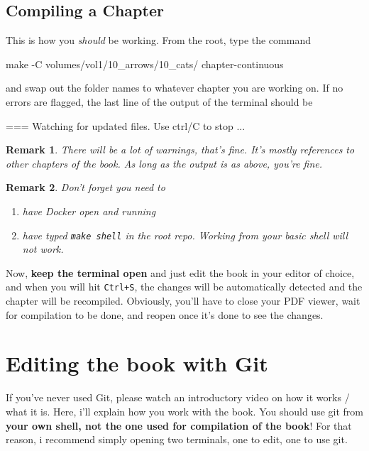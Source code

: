 \documentclass{article}
\newtheorem{remark}{Remark}
\begin{document}
\subsection{Compiling a Chapter}
This is how you \textit{should} be working. From the root, type the command
\begin{bashcode}
    make -C volumes/vol1/10_arrows/10_cats/ chapter-continuous
\end{bashcode}
and swap out the folder names to whatever chapter you are working on. If no errors are flagged, the last line of the output of the terminal should be 
\begin{bashcode}
    === Watching for updated files. Use ctrl/C to stop ...
\end{bashcode}
\begin{remark}
    There will be a lot of warnings, that's fine. It's mostly references to other chapters of the book. As long as the output is as above, you're fine.
\end{remark}
\begin{remark}
    Don't forget you need to 
    \begin{enumerate}
        \item have Docker open and running
        \item have typed \texttt{make shell} in the root repo. Working from your basic shell will not work.
    \end{enumerate}
\end{remark}
Now, \textbf{keep the terminal open} and just edit the book in your editor of choice, and when you will hit \texttt{Ctrl+S}, the changes will be automatically detected and the chapter will be recompiled. Obviously, you'll have to close your PDF viewer, wait for compilation to be done, and reopen once it's done to see the changes. 

\section{Editing the book with Git}
If you've never used Git, please watch an introductory video on how it works / what it is. Here, i'll explain how you work with the book. You should use git from \textbf{your own shell, not the one used for compilation of the book}! For that reason, i recommend simply opening two terminals, one to edit, one to use git.
\end{document}
